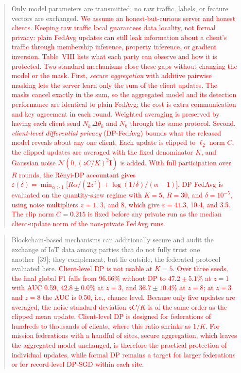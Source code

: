 \documentclass[11pt]{article}
\newenvironment{excerpt}{\begin{quote}\sloppy}{\end{quote}}
\begin{document}
\begin{excerpt}
Only model parameters are transmitted; no raw traffic, labels,
or feature vectors are exchanged. \textcolor{red}{We assume
an honest-but-curious server and honest clients. Keeping raw traffic
local guarantees data locality, not formal privacy: plain FedAvg
updates can still leak information about a client's traffic through
membership inference, property inference, or gradient inversion.
Table~VIII lists what each party can observe and
how it is protected. Two standard mechanisms close these gaps without
changing the model or the mask. First, \textit{secure aggregation}
with additive pairwise masking lets the server learn only the sum of
the client updates. The masks cancel exactly in the sum, so the
aggregated model and its detection performance are identical to plain
FedAvg; the cost is extra communication and key agreement in each
round. Weighted averaging is preserved by having each client send
$N_k\,\Delta\theta_k$ and $N_k$ through the same protocol. Second,
\textit{client-level differential privacy} (DP-FedAvg) bounds what
the released model reveals about any one client. Each update is
clipped to $\ell_2$ norm $C$, the clipped updates are averaged with
the fixed denominator $K$, and Gaussian noise
$\mathcal{N}(0,(zC/K)^2\mathbf{I})$ is added. With full participation
over $R$ rounds, the R\'enyi-DP accountant gives
$\varepsilon(\delta)=\min_{\alpha>1}\bigl[R\alpha/(2z^2)+
\log(1/\delta)/(\alpha-1)\bigr]$. DP-FedAvg is evaluated on the
quantity-skew regime with $K=5$, $R=30$, and $\delta=10^{-5}$, using
noise multipliers $z=1$, 3, and 8, which give $\varepsilon=41.3$,
10.4, and 3.5. The clip norm $C=0.215$ is fixed before any private
run as the median client-update norm of the non-private FedAvg runs.}
\end{excerpt}
\begin{excerpt}
Blockchain-based mechanisms can additionally secure and audit the
exchange of IoT data among parties that do not fully trust one
another~{[39]}; they complement, but lie outside,
the federated protocol evaluated here.
\textcolor{red}{Client-level DP is not usable at $K=5$. Over
three seeds, the final global F1 falls from 96.66\% without DP to
$47.2\pm5.1\%$ at $z=1$ with AUC 0.59, $42.8\pm0.0\%$ at $z=3$, and
$36.7\pm10.4\%$ at $z=8$; at $z=3$ and $z=8$ the AUC is 0.50, i.e.,
chance level. Because only five updates are averaged, the noise
standard deviation $zC/K$ is of the same order as the clipped mean
update. Client-level DP is designed for federations of hundreds to
thousands of clients, where this ratio shrinks as $1/K$. For mission
federations with a handful of sites, secure aggregation, which leaves
the aggregated model unchanged, is therefore the practical protection
of individual updates, while formal DP remains a target for larger
federations or for record-level DP-SGD within each site.}
\end{excerpt}
\end{document}
